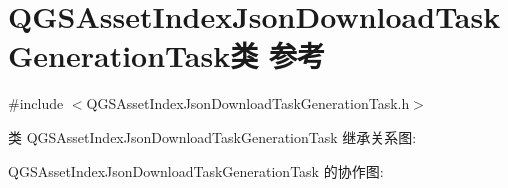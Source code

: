 \hypertarget{class_q_g_s_asset_index_json_download_task_generation_task}{}\section{Q\+G\+S\+Asset\+Index\+Json\+Download\+Task\+Generation\+Task类 参考}
\label{class_q_g_s_asset_index_json_download_task_generation_task}


{\ttfamily \#include $<$Q\+G\+S\+Asset\+Index\+Json\+Download\+Task\+Generation\+Task.\+h$>$}



类 Q\+G\+S\+Asset\+Index\+Json\+Download\+Task\+Generation\+Task 继承关系图\+:


Q\+G\+S\+Asset\+Index\+Json\+Download\+Task\+Generation\+Task 的协作图\+:
